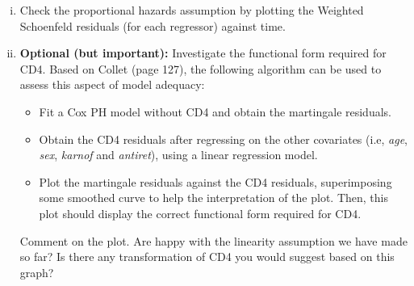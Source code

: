 \begin{enumerate}[(a)]
\begin{enumerate}[(i)]
\item Check the proportional hazards assumption by plotting the Weighted Schoenfeld residuals (for each regressor) against time.
\item \textbf{Optional (but important):} Investigate the functional form required for CD4. Based on Collet (page 127), the following algorithm can be used to assess this aspect of model adequacy:
\begin{itemize}
\item Fit a Cox PH model without CD4 and obtain the martingale residuals.
\item Obtain the CD4 residuals after regressing on the other covariates (i.e, \emph{age}, \emph{sex}, \emph{karnof} and \emph{antiret}), using a linear regression model.
\item Plot the martingale residuals against the CD4 residuals, superimposing some smoothed curve to help the interpretation of the plot. Then, this plot should display the correct functional form required for CD4.
\end{itemize}
Comment on the plot. Are happy with the linearity assumption we have made so far? Is there any transformation of CD4 you would suggest based on this graph?
\end{enumerate}
\end{enumerate}